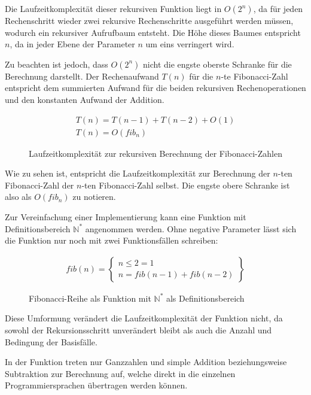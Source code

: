 \documentclass[11pt, parskip=half]{scrartcl}       %
\newcommand*{\N}{\mathbb{N}}
\begin{document}
Die Laufzeitkomplexität dieser rekursiven Funktion liegt in $O(2^{n})$, da für jeden Rechenschritt wieder zwei rekursive Rechenschritte ausgeführt werden müssen, wodurch ein rekursiver Aufrufbaum entsteht.
Die Höhe dieses Baumes entspricht $n$, da in jeder Ebene der Parameter $n$ um eins verringert wird.

Zu beachten ist jedoch, dass $O(2^{n})$ nicht die engste oberste Schranke für die Berechnung darstellt.
Der Rechenaufwand $T(n)$ für die $n$-te Fibonacci-Zahl entspricht dem summierten Aufwand für die beiden rekursiven Rechenoperationen und den konstanten Aufwand der Addition.
\begin{figure}[h]
  \centering
  \begin{gather*}
    T(n) = T(n-1) + T(n-2) + O(1) \\
    T(n) = O(fib_{n})
  \end{gather*}
  \caption{Laufzeitkomplexität zur rekursiven Berechnung der Fibonacci-Zahlen}
  \label{fig:fib-komplexität}
\end{figure}

Wie zu sehen ist, entspricht die Laufzeitkomplexität zur Berechnung der $n$-ten Fibonacci-Zahl der $n$-ten Fibonacci-Zahl selbst.
Die engste obere Schranke ist also als $O(fib_{n})$ zu notieren.

Zur Vereinfachung einer Implementierung kann eine Funktion mit Definitionsbereich $\N^*$ angenommen werden. Ohne negative Parameter lässt sich die Funktion nur noch mit zwei Funktionsfällen schreiben:

\begin{figure}[h]
  \centering
  \begin{gather*}
    fib (n) = \left.
      \begin{cases}
        n \leq 2 = 1 \\
        n = fib(n-1) + fib(n-2)
      \end{cases}
    \right\}    
  \end{gather*}
  \caption{Fibonacci-Reihe als Funktion mit $\N^*$ als Definitionsbereich}
  \label{fig:fib2}
\end{figure}

Diese Umformung verändert die Laufzeitkomplexität der Funktion nicht, da sowohl der Rekursionsschritt unverändert bleibt als auch die Anzahl und Bedingung der Basisfälle.

In der Funktion treten nur Ganzzahlen und simple Addition beziehungsweise Subtraktion zur Berechnung auf, welche direkt in die einzelnen Programmiersprachen übertragen werden können.
\end{document}
